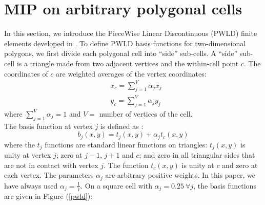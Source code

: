 \section{MIP on arbitrary polygonal cells}
In this section, we introduce the PieceWise Linear Discontinuous (PWLD) finite
elements developed in \cite{pwld_2d,pwld_3d,pwld_diffusion}. To define PWLD
basis functions for two-dimensional polygons, we first divide each polygonal
cell into ``side'' sub-cells. A ``side'' sub-cell is a triangle made from two
adjacent vertices and the within-cell point $c$. The coordinates of $c$ are weighted
averages of the vertex coordinates:
\begin{align}
& x_c = \sum_{j=1}^{V} \alpha_{j} x_j\\
& y_c = \sum_{j=1}^{V} \alpha_{j} y_j
\end{align}
where $\sum_{j=1}^{V} \alpha_{j}=1$ and $V=$ number of vertices of the cell.\\
The basis function at vertex $j$ is defined as \cite{pwld_2d}:
\begin{equation}
b_{j} (x,y) = t_{j}(x,y) + \alpha_j t_c(x,y)
\end{equation}
where the $t_j$ functions are standard linear functions on triangles: $t_j
(x,y)$ is unity at vertex $j$; zero at $j-1$, $j+1$ and $c$; and zero in all
triangular sides that are not in contact with vertex $j$. The function $t_c
(x,y)$ is unity at $c$ and zero at each vertex. The parameters $\alpha_{j}$
are arbitrary positive weights. In this paper, we have always used 
$\alpha_{j}=\frac{1}{V}$. On a square cell with $\alpha_{j}=0.25\ \forall j$, 
the basis functions are given in Figure (\ref{pwld}):
